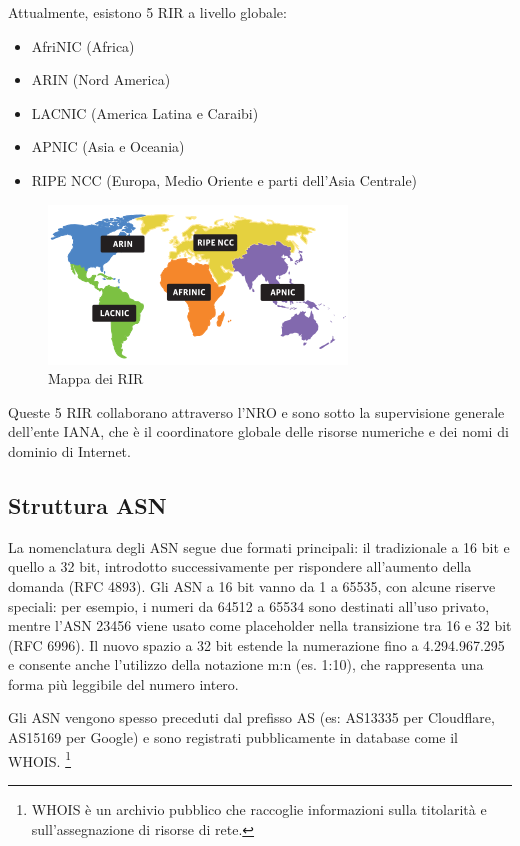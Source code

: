 \documentclass[12pt,a4paper,twoside]{book}
\begin{document}
Attualmente, esistono 5 \ac{RIR} a livello globale:
\begin{itemize}
    \item AfriNIC (Africa)
    \item ARIN (Nord America)
    \item LACNIC (America Latina e Caraibi)
    \item APNIC (Asia e Oceania)
    \item RIPE NCC (Europa, Medio Oriente e parti dell'Asia Centrale)
\end{itemize}
\begin{figure}[H]
    \centering
    \includegraphics[width=.8\linewidth]{tesi/img/rir-map.png}
    \caption{Mappa dei RIR \cite{iana_RIR}}
    \label{fig:mappa_rir}
\end{figure}
Queste 5 \ac{RIR} collaborano attraverso l'\ac{NRO} e sono sotto la supervisione generale dell'ente \ac{IANA}, che è il coordinatore globale delle risorse numeriche e dei nomi di dominio di Internet. 

\subsection{Struttura ASN}
La nomenclatura degli \ac{ASN} segue due formati principali: il tradizionale a 16 bit e quello a 32 bit, introdotto successivamente per rispondere all’aumento della domanda (RFC 4893). Gli \ac{ASN} a 16 bit vanno da 1 a 65535, con alcune riserve speciali: per esempio, i numeri da 64512 a 65534 sono destinati all’uso privato, mentre l’\ac{ASN} 23456 viene usato come placeholder nella transizione tra 16 e 32 bit (RFC 6996). Il nuovo spazio a 32 bit estende la numerazione fino a 4.294.967.295 e consente anche l’utilizzo della notazione m:n (es. 1:10), che rappresenta una forma più leggibile del numero intero.

Gli \ac{ASN} vengono spesso preceduti dal prefisso AS (es: AS13335 per Cloudflare, AS15169 per Google) e sono registrati pubblicamente in database come il WHOIS. \footnote{WHOIS è un archivio pubblico che raccoglie informazioni sulla titolarità e sull'assegnazione di risorse di rete.} 
\cite{rfc6996}
\end{document}
